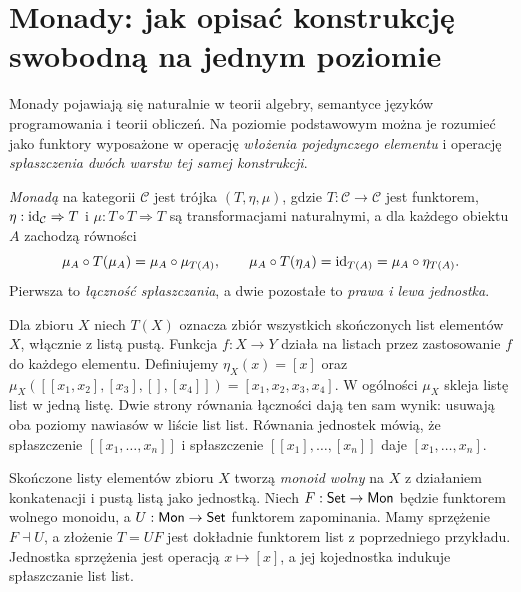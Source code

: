 \section{Monady: jak opisać konstrukcję swobodną na jednym poziomie}\label{sec:monads}

Monady pojawiają się naturalnie w teorii algebry, semantyce języków programowania i teorii obliczeń. Na poziomie podstawowym można je rozumieć jako funktory wyposażone w operację \emph{włożenia pojedynczego elementu} i operację \emph{spłaszczenia dwóch warstw tej samej konstrukcji}.

\begin{definicja}[Monad]\label{def:monad}
\emph{Monadą} na kategorii $\mathcal C$ jest trójka $(T,\eta,\mu)$, gdzie $T:\mathcal C\to\mathcal C$ jest funktorem, $\eta:\mathrm{id}_{\mathcal C}\Rightarrow T$ i $\mu:T\circ T\Rightarrow T$ są transformacjami naturalnymi, a dla każdego obiektu $A$ zachodzą równości
\[
\mu_A\circ T(\mu_A)=\mu_A\circ\mu_{T(A)},\qquad\mu_A\circ T(\eta_A)=\mathrm{id}_{T(A)}=\mu_A\circ\eta_{T(A)}.
\]
Pierwsza to \emph{łączność spłaszczania}, a dwie pozostałe to \emph{prawa i lewa jednostka}.
\end{definicja}

\begin{przyklad}\label{przyklad:list-monad}
Dla zbioru $X$ niech $T(X)$ oznacza zbiór wszystkich skończonych list elementów $X$, włącznie z listą pustą. Funkcja $f:X\to Y$ działa na listach przez zastosowanie $f$ do każdego elementu. Definiujemy $\eta_X(x)=[x]$ oraz $\mu_X([[x_1,x_2],[x_3],[],[x_4]])=[x_1,x_2,x_3,x_4]$. W ogólności $\mu_X$ skleja listę list w jedną listę. Dwie strony równania łączności dają ten sam wynik: usuwają oba poziomy nawiasów w liście list list. Równania jednostek mówią, że spłaszczenie $[[x_1,\ldots,x_n]]$ i spłaszczenie $[[x_1],\ldots,[x_n]]$ daje $[x_1,\ldots,x_n]$.
\end{przyklad}

\begin{przyklad}
Skończone listy elementów zbioru $X$ tworzą \emph{monoid wolny} na $X$ z działaniem konkatenacji i pustą listą jako jednostką. Niech $F:\mathsf{Set}\to\mathsf{Mon}$ będzie funktorem wolnego monoidu, a $U:\mathsf{Mon}\to\mathsf{Set}$ funktorem zapominania. Mamy sprzężenie $F\dashv U$, a złożenie $T=UF$ jest dokładnie funktorem list z poprzedniego przykładu. Jednostka sprzężenia jest operacją $x\mapsto[x]$, a jej kojednostka indukuje spłaszczanie list list.
\end{przyklad}


